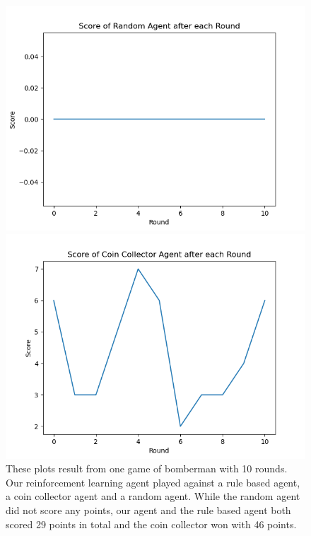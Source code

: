 \begin{figure}[H]
\begin{minipage}{0.49\textwidth}
    \end{minipage}
    \begin{minipage}{0.49\textwidth}
		\centering
		\includegraphics[scale=0.52]{images/random_scores11_1.png}
    \end{minipage}
    \begin{minipage}{0.49\textwidth}
	\centering
		\includegraphics[scale=0.52]{images/coin_scores11_1.png}
    \end{minipage}
    \caption{These plots result from one game of bomberman with 10 rounds. Our reinforcement learning agent played against a rule based agent, a coin collector agent and a random agent. While the random agent did not score any points, our agent and the rule based agent both scored 29 points in total and the coin collector won with 46 points.}
    \label{fig:game1}
\end{figure}

